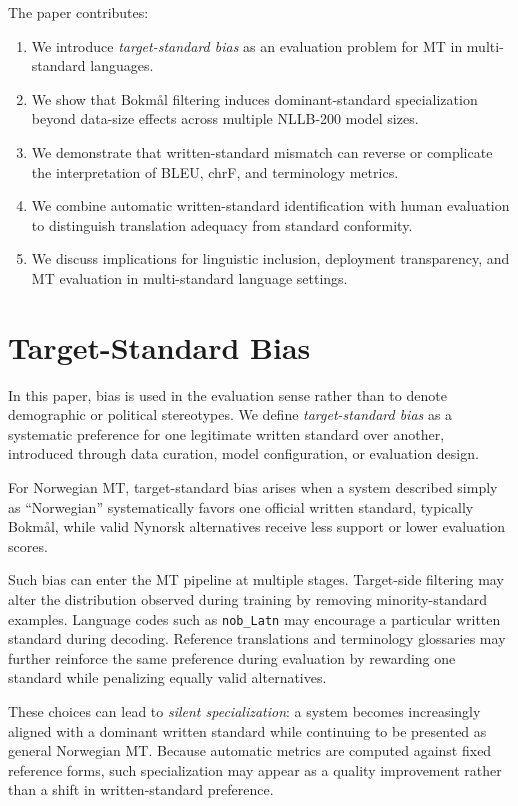 \documentclass[11pt]{article}
\newcommand{\nb}{Bokm{\aa}l}
\newcommand{\nn}{Nynorsk}
\begin{document}
The paper contributes:
\begin{enumerate}
    \item We introduce \emph{target-standard bias} as an evaluation problem for MT in multi-standard languages.
    \item We show that \nb{} filtering induces dominant-standard specialization beyond data-size effects across multiple NLLB-200 model sizes.
    \item We demonstrate that written-standard mismatch can reverse or complicate the interpretation of BLEU, chrF, and terminology metrics.
    \item We combine automatic written-standard identification with human evaluation to distinguish translation adequacy from standard conformity.
    \item We discuss implications for linguistic inclusion, deployment transparency, and MT evaluation in multi-standard language settings.
\end{enumerate}

\section{Target-Standard Bias}
\label{sec:bias}

In this paper, bias is used in the evaluation sense rather than to denote demographic or political stereotypes. We define \emph{target-standard bias} as a systematic preference for one legitimate written standard over another, introduced through data curation, model configuration, or evaluation design.

For Norwegian MT, target-standard bias arises when a system described simply as ``Norwegian'' systematically favors one official written standard, typically \nb{}, while valid \nn{} alternatives receive less support or lower evaluation scores.

Such bias can enter the MT pipeline at multiple stages. Target-side filtering may alter the distribution observed during training by removing minority-standard examples. Language codes such as \texttt{nob\_Latn} may encourage a particular written standard during decoding. Reference translations and terminology glossaries may further reinforce the same preference during evaluation by rewarding one standard while penalizing equally valid alternatives.

These choices can lead to \emph{silent specialization}: a system becomes increasingly aligned with a dominant written standard while continuing to be presented as general Norwegian MT. Because automatic metrics are computed against fixed reference forms, such specialization may appear as a quality improvement rather than a shift in written-standard preference.
\end{document}
